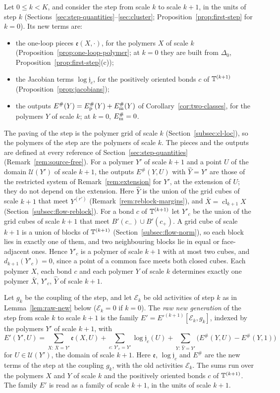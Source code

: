 Let $0\le k<K$, and consider the step from scale $k$ to scale $k+1$, in the units of step $k$ (Sections~\ref{sec:step-quantities}--\ref{sec:cluster}; Proposition~\ref{prop:first-step} for $k=0$). Its new terms are:
\begin{itemize}
\item the one-loop pieces $\mathfrak e(X,\cdot)$, for the polymers $X$ of scale $k$ (Proposition~\ref{prop:one-loop-polymer}; at $k=0$ they are built from $\Delta_0$, Proposition~\ref{prop:first-step}(c));
\item the Jacobian terms $\log\mathfrak j_c$, for the positively oriented bonds $c$ of $\mathbb T^{(k+1)}$ (Proposition~\ref{prop:jacobians});
\item the outputs $E^\#(Y)=E^\#_{\rm p}(Y)+E^\#_{\rm m}(Y)$ of Corollary~\ref{cor:two-classes}, for the polymers $Y$ of scale $k$; at $k=0$, $E^\#_{\rm m}=0$.
\end{itemize}
The paving of the step is the polymer grid of scale $k$ (Section~\ref{subsec:cl-loc}), so the polymers of the step are the polymers of scale $k$. The pieces and the outputs are defined at every reference of Section~\ref{sec:step-quantities} (Remark~\ref{rem:source-free}). For a polymer $Y'$ of scale $k+1$ and a point $U$ of the domain $\mathcal U(Y')$ of scale $k+1$, the outputs $E^\#(Y,U)$ with $\hat Y=Y'$ are those of the restricted system of Remark~\ref{rem:extension} for $Y'$, at the extension of $U$; they do not depend on the extension. Here $\hat Y$ is the union of the grid cubes of scale $k+1$ that meet $Y^{(r')}$ (Remark~\ref{rem:reblock-margins}), and $\bar X=\operatorname{cl}_{k+1}X$ (Section~\ref{subsec:flow-reblock}). For a bond $c$ of $\mathbb T^{(k+1)}$ let $Y'_c$ be the union of the grid cubes of scale $k+1$ that meet $B'(c_-)\cup B'(c_+)$. A grid cube of scale $k+1$ is a union of blocks of $\mathbb T^{(k+1)}$ (Section~\ref{subsec:flow-norm}), so each block lies in exactly one of them, and two neighbouring blocks lie in equal or face-adjacent ones. Hence $Y'_c$ is a polymer of scale $k+1$ with at most two cubes, and $d_{k+1}(Y'_c)=0$, since a point of a common face meets both closed cubes. Each polymer $X$, each bond $c$ and each polymer $Y$ of scale $k$ determines exactly one polymer $\bar X$, $Y'_c$, $\hat Y$ of scale $k+1$.

\begin{definition}\label{def:raw-new}
Let $g_k$ be the coupling of the step, and let $\mathcal E_k$ be old activities of step $k$ as in Lemma~\ref{lem:raw-new} below ($\mathcal E_k=0$ if $k=0$). The \emph{raw new generation} of the step from scale $k$ to scale $k+1$ is the family $E'=E'^{(k+1)}[\mathcal E_k,g_k]$, indexed by the polymers $Y'$ of scale $k+1$, with
\[
E'(Y',U)=\sum_{X:\,\bar X=Y'}\mathfrak e(X,U)+\sum_{c:\,Y'_c=Y'}\log\mathfrak j_c(U)+\sum_{Y:\,\hat Y=Y'}\big(E^\#(Y,U)-E^\#(Y,1)\big)
\]
for $U\in\mathcal U(Y')$, the domain of scale $k+1$. Here $\mathfrak e$, $\log\mathfrak j_c$ and $E^\#$ are the new terms of the step at the coupling $g_k$, with the old activities $\mathcal E_k$. The sums run over the polymers $X$ and $Y$ of scale $k$ and the positively oriented bonds $c$ of $\mathbb T^{(k+1)}$. The family $E'$ is read as a family of scale $k+1$, in the units of scale $k+1$.
\end{definition}

